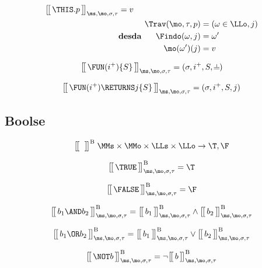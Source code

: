 \begin{align*}
  \Express{\THIS.p}{\ms,\mo,\sigma,\tau} &= v \\
                                     &\desda
  \begin{aligned}
                 \Trav(\mo,\tau,p) &= (\omega\in\LLo,j) \\
                   \Findo(\omega,j) &= \omega' \\
                    \mo(\omega')(j) &= v
  \end{aligned}
\end{align*}

\begin{equation*}
  \Express{\FUN (i^+) \{S\}}{\ms,\mo,\sigma,\tau} = (\sigma, i^+, S, \nil)
\end{equation*}

\begin{equation*}
  \Express{\FUN (i^+) \RETURNS j \{S\}}{\ms,\mo,\sigma,\tau} = (\sigma, i^+, S, j)
\end{equation*}

\subsection{Boolse}

\begin{equation*}
  \Express[B]{\;}{} \; \MMs \times \MMo \times \LLs \times \LLo \rightarrow {\T,\F}
\end{equation*}

\begin{equation*}
  \Express[B]{\TRUE}{\ms,\mo,\sigma,\tau} = \T
\end{equation*}

\begin{equation*}
  \Express[B]{\FALSE}{\ms,\mo,\sigma,\tau} = \F
\end{equation*}

\begin{equation*}
  \Express[B]{b_1 \AND b_2}{\ms,\mo,\sigma,\tau}
  = \Express[B]{b_1}{\ms,\mo,\sigma,\tau} \land \Express[B]{b_2}{\ms,\mo,\sigma,\tau}
\end{equation*}

\begin{equation*}
  \Express[B]{b_1 \OR b_2}{\ms,\mo,\sigma,\tau}
  = \Express[B]{b_1}{\ms,\mo,\sigma,\tau} \lor \Express[B]{b_2}{\ms,\mo,\sigma,\tau}
\end{equation*}

\begin{equation*}
  \Express[B]{\NOT b}{\ms,\mo,\sigma,\tau}
  = \lnot \Express[B]{b}{\ms,\mo,\sigma,\tau}
\end{equation*}

